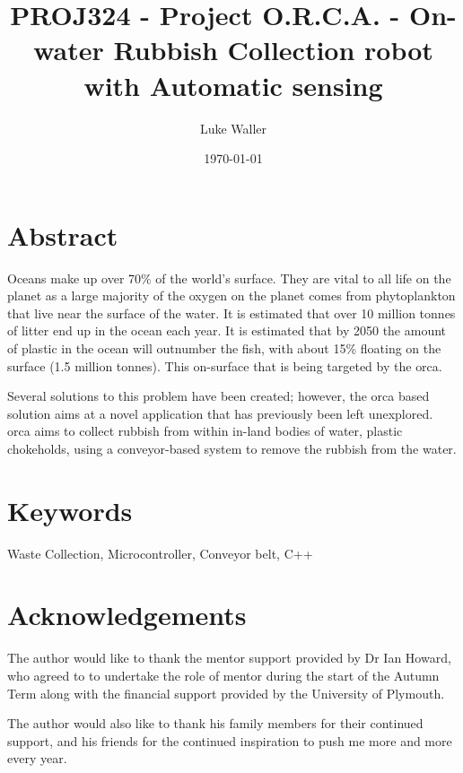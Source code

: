 \documentclass [12pt]{article}
\begin{document}
							
\title{\bf PROJ324 - Project O.R.C.A. - On-water Rubbish Collection robot with Automatic sensing} 	
\author{Luke Waller} 								
\date{\today} 										
\maketitle
\thispagestyle{empty}


\newpage 	

\section*{Abstract}

Oceans make up over 70\% of the world’s surface. They are vital to all life on the planet as a large majority of the oxygen on the planet comes from phytoplankton that live near the surface of the water. It is estimated that over 10 million tonnes of litter end up in the ocean each year. It is estimated that by 2050 the amount of plastic in the ocean will outnumber the fish, with about 15\% floating on the surface (1.5 million tonnes). This on-surface that is being targeted by the \gls{orca}.

Several solutions to this problem have been created; however, the \gls{orca} based solution aims at a novel application that has previously been left unexplored. \gls{orca} aims to collect rubbish from within in-land bodies of water, plastic chokeholds, using a conveyor-based system to remove the rubbish from the water.

\section*{Keywords} 
Waste Collection, Microcontroller, Conveyor belt, C++

\newpage
\section*{Acknowledgements}

The author would like to thank the mentor support provided by Dr Ian Howard, who agreed to to undertake the role of mentor during the start of the Autumn Term along with the financial support provided by the University of Plymouth. 

The author would also like to thank his family members for their continued support, and his friends for the continued inspiration to push me more and more every year.
\end{document}
